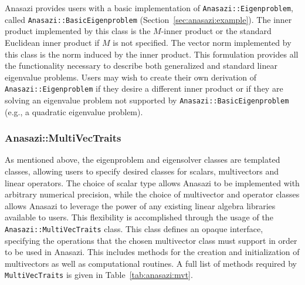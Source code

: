 Anasazi provides users with a basic implementation of
\verb!Anasazi::Eigenproblem!, called \verb!Anasazi::BasicEigenproblem!
(Section~\ref{sec:anasazi:example}).  The inner product implemented by this
class is the $M$-inner product or the standard Euclidean inner product if $M$
is not specified. The vector norm implemented by this class is the norm induced
by the inner product.  This formulation provides all the functionality
necessary to describe both generalized and standard linear eigenvalue problems.
Users may wish to create their own derivation of \verb!Anasazi::Eigenproblem!
if they desire a different inner product or if they are solving an eigenvalue
problem not supported by \verb!Anasazi::BasicEigenproblem! (e.g., a quadratic
eigenvalue problem).

\subsubsection{Anasazi::MultiVecTraits}
\label{sec:anasazi:mvt}

As mentioned above, the eigenproblem and eigensolver classes are templated
classes, allowing users to specify desired classes for scalars, multivectors
and linear operators. The choice of scalar type allows Anasazi to be implemented
with arbitrary numerical precision, while the choice of multivector and operator
classes allows Anasazi to leverage the power of any existing linear algebra
libraries available to users. This flexibility is accomplished through the
usage of the \verb!Anasazi::MultiVecTraits! class. This class defines an opaque
interface, specifying the operations that the chosen multivector class must
support in order to be used in Anasazi. This includes methods for the creation
and initialization of multivectors as well as computational routines. A full
list of methods required by \verb!MultiVecTraits! is given in
Table~\ref{tab:anasazi:mvt}.

